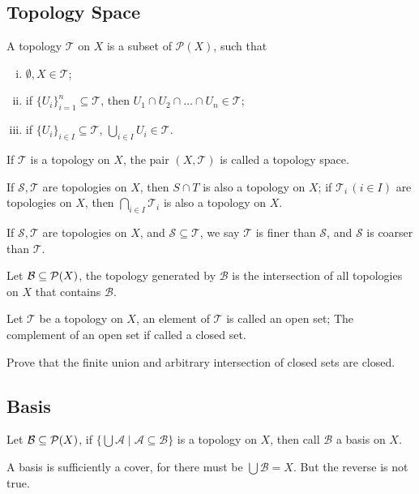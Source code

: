 \subsection{Topology Space}
\begin{defi}
A topology $\mathcal{T}$ on $X$ is a subset of $\mathcal{P}(X)$, such that
\begin{enumerate}[i).]
\item $\emptyset, X \in \mathcal{T}$;
\item if $\{U_i\}_{i=1}^n \subseteq \mathcal{T}$, then $U_1 \cap U_2 \cap \dots \cap U_n \in \mathcal{T}$;
\item if $\{U_i\}_{i \in I} \subseteq \mathcal{T}$, $\bigcup_{i \in I} U_i \in \mathcal{T}$.
\end{enumerate}
\end{defi}
If $\mathcal{T}$ is a topology on $X$, the pair $(X, \mathcal{T})$ is called a topology space.

\begin{pro}
If $\mathcal{S}, \mathcal{T}$ are topologies on $X$, then $S \cap T$ is also a topology on $X$;
if $\mathcal{T}_i \, (i \in I)$ are topologies on $X$, then $\bigcap_{i \in I} \mathcal{T}_i$ is also a topology on $X$.
\end{pro}

If $\mathcal{S}, \mathcal{T}$ are topologies on $X$, and $\mathcal{S} \subseteq \mathcal{T}$,
we say $\mathcal{T}$ is finer than $\mathcal{S}$,
and $\mathcal{S}$ is coarser than $\mathcal{T}$.

\begin{defi}
Let $\mathcal{B} \subseteq \mathcal{P}(X)$, the topology generated by $\mathcal{B}$
is the intersection of all topologies on $X$ that contains $\mathcal{B}$.
\end{defi}

\begin{defi}
Let $\mathcal{T}$ be a topology on $X$,
an element of $\mathcal{T}$ is called an open set;
The complement of an open set if called a closed set.
\end{defi}

\begin{exer}
Prove that the finite union and arbitrary intersection of closed sets are closed.
\end{exer}

\subsection{Basis}
\begin{defi}
Let $\mathcal{B} \subseteq \mathcal{P}(X)$, if $\{\bigcup \mathcal{A} \mid \mathcal{A} \subseteq \mathcal{B}\}$
is a topology on $X$, then call $\mathcal{B}$ a basis on $X$.
\end{defi}
A basis is sufficiently a cover, for there must be $\bigcup \mathcal{B} = X$.
But the reverse is not true.

